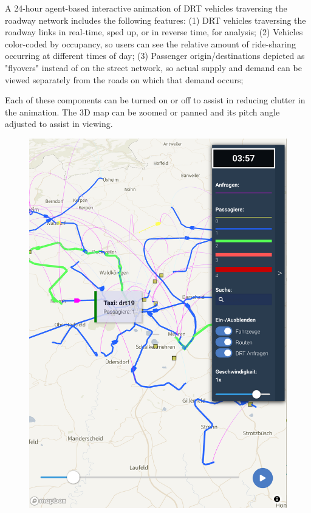 A 24-hour agent-based interactive animation of DRT vehicles traversing the roadway network includes the following features: (1) DRT vehicles traversing the roadway links in real-time, sped up, or in reverse time, for analysis; (2) Vehicles color-coded by occupancy, so users can see the relative amount of ride-sharing occurring at different times of day; (3) Passenger origin/destinations depicted as "flyovers" instead of on the street network, so actual supply and demand can be viewed separately from the roads on which that demand occurs;

Each of these components can be turned on or off to assist in reducing clutter in the animation. The 3D map can be zoomed or panned and its pitch angle adjusted to assist in viewing.

\begin{figure}[ht]
\centering
\begin{minipage}[c]{0.4\textwidth}
   \includegraphics[width=\linewidth]{chapters/22-avov/images/fig-drt-vehicles.png}

\end{minipage}
\end{figure}
